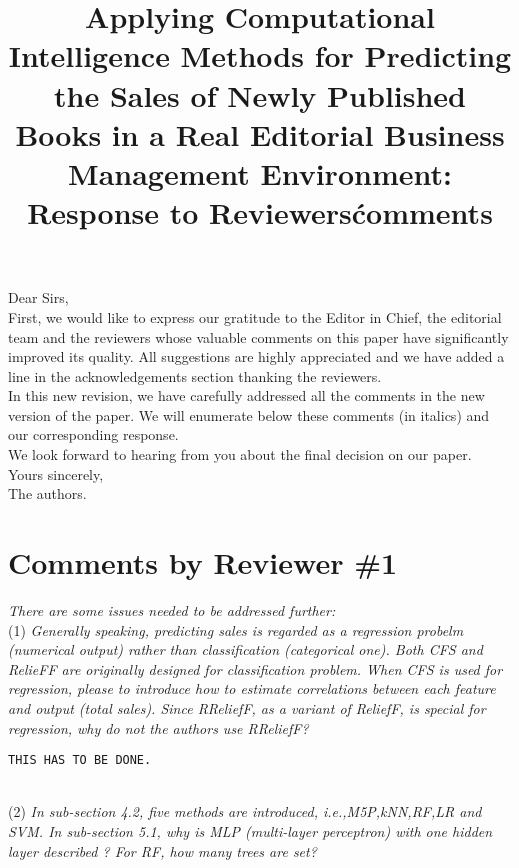 \documentclass[preprint]{elsarticle}
\begin{document}

\title{Applying Computational Intelligence Methods for Predicting the Sales of Newly Published Books in a Real Editorial Business Management Environment: Response to Reviewers\' comments}

\noindent
Dear Sirs,\\

First, we would like to express our gratitude to the Editor in Chief,
the editorial team and the reviewers whose valuable comments on this
paper have significantly improved its quality. All suggestions are
highly appreciated and we have added a line in the acknowledgements
section thanking the reviewers. \\ 

In this new revision, we have carefully addressed all the comments in
the new version of the paper. We will enumerate below these comments
(in italics) and our corresponding response. \\ 

We look forward to hearing from you about the final decision on our paper. \\

\noindent
Yours sincerely,\\
The authors.


\section{Comments by Reviewer \#1}

\noindent \emph{There are some issues needed to be addressed further:} \\

\noindent (1) \emph{Generally speaking, predicting sales is regarded as a regression probelm (numerical output) rather than classification (categorical one). Both CFS and RelieFF are originally designed for classification problem. When CFS is used for regression, please to introduce how to estimate correlations between each feature and output (total sales). Since RReliefF, as a variant of ReliefF, is special for regression, why do not the authors use RReliefF? } 

\begin{verbatim}
THIS HAS TO BE DONE.
\end{verbatim}

~\\
\noindent (2) \emph{In sub-section 4.2, five methods are introduced, i.e.,M5P,kNN,RF,LR and SVM. In sub-section 5.1, why is MLP (multi-layer perceptron) with one hidden layer described ? For RF, how many trees are set? } 
\end{document}

